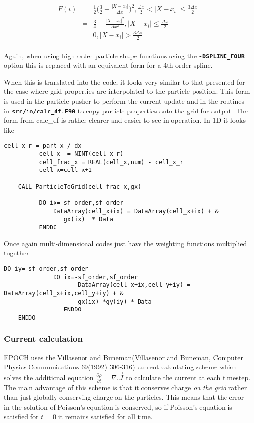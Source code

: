 \documentclass[12pt]{article}
\newcommand{\simpleboxverbatim}{\begin{Verbatim}[obeytabs=true,frame=single,
  framerule=0.5mm,rulecolor=\color{warwickmid}]}
\newcommand{\inlinecode}[1]{{\color{warwickred} \bf\texttt{#1}}}
\newcommand{\EPOCH}{{\color{warwickdark}\fontfamily{phv}\selectfont EPOCH} }
\begin{document}
\begin{eqnarray*}
  F(i) &=& \frac{1}{2} \bigl(\frac{3}{2} - \frac{|X - x_i|}{\Delta x} \bigr)^2, \frac{\Delta x}{2} < |X-x_i| \le \frac{3 \Delta x}{2}\\
  &=& \frac{3}{4} - \frac{|X-x_i|^2}{\Delta x^2}, |X-x_i| \le \frac{\Delta x}{2}\\
  &=& 0, |X-x_i| > \frac{3 \Delta x}{2}\\
\end{eqnarray*}

Again, when using high order particle shape functions using the
\inlinecode{-DSPLINE\_FOUR} option this is replaced with an equivalent form for
a 4th order spline.

When this is translated into the code, it looks very similar to that presented
for the case where grid properties are interpolated to the particle
position. This form is used in the particle pusher to perform the current
update and in the routines in \inlinecode{src/io/calc\_df.F90} to copy particle
properties onto the grid for output. The form from calc\_df is rather clearer
and easier to see in operation. In 1D it looks like

\simpleboxverbatim
          cell_x_r = part_x / dx
          cell_x  = NINT(cell_x_r)
          cell_frac_x = REAL(cell_x,num) - cell_x_r
          cell_x=cell_x+1

	CALL ParticleToGrid(cell_frac_x,gx)

          DO ix=-sf_order,sf_order
              DataArray(cell_x+ix) = DataArray(cell_x+ix) + &
                 gx(ix)  * Data
          ENDDO
\end{Verbatim}

Once again multi-dimensional codes just have the weighting functions multiplied
together
\simpleboxverbatim
	DO iy=-sf_order,sf_order
	          DO ix=-sf_order,sf_order
         		     DataArray(cell_x+ix,cell_y+iy) = DataArray(cell_x+ix,cell_y+iy) + &
	                 gx(ix) *gy(iy) * Data
         		 ENDDO
	ENDDO
\end{Verbatim}

\subsubsection{Current calculation}
\EPOCH uses the Villasenor and Buneman(Villasenor and Buneman, Computer Physics
Communications 69(1992) 306-316) current calculating scheme which solves the
additional equation $\frac{\partial \rho}{\partial t} = \nabla . \vec{J}$ to
calculate the current at each timestep. The main advantage of this scheme is
that it conserves charge {\it on the grid} rather than just globally conserving
charge on the particles. This means that the error in the solution of Poisson's
equation is conserved, so if Poisson's equation is satisfied for $t=0$ it
remains satisfied for all time.\\
\end{document}
